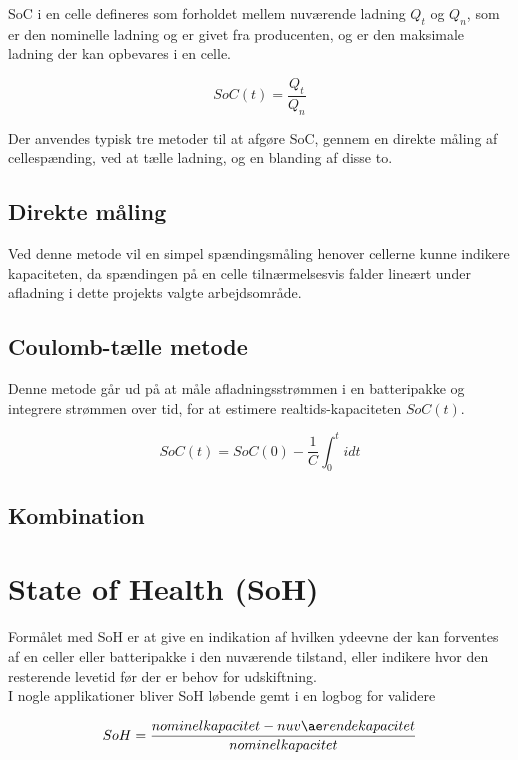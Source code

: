 SoC i en celle defineres som forholdet mellem nuværende ladning $Q_{t}$ og $Q_{n}$, som er den nominelle ladning og er givet fra producenten, og er den maksimale ladning der kan opbevares i en celle.

\begin {equation} 
SoC(t) = \frac{Q_t}{Q_n} \label{eq:soc}
\end {equation}

Der anvendes typisk tre metoder til at afgøre SoC, gennem en direkte måling af cellespænding, ved at tælle ladning, og en blanding af disse to.

\subsection{Direkte måling}
Ved denne metode vil en simpel spændingsmåling henover cellerne kunne indikere kapaciteten, da spændingen på en celle tilnærmelsesvis falder lineært under afladning i dette projekts valgte arbejdsområde.

\subsection{Coulomb-tælle metode}
Denne metode går ud på at måle afladningsstrømmen i en batteripakke og integrere strømmen over tid, for at estimere realtids-kapaciteten $SoC(t)$. 


\begin {equation} 
SoC(t) = SoC(0) - \frac{1}{C} \int_{0}^{t} idt  \label{eq:coulomb-count}
\end {equation}


\subsection{Kombination}


\section{State of Health (SoH)}
Formålet med SoH er at give en indikation af hvilken ydeevne der kan forventes af en celler eller batteripakke i den nuværende tilstand, eller indikere hvor den resterende levetid før der er behov for udskiftning.
\\
I nogle applikationer bliver SoH løbende gemt i en logbog for validere

\begin {equation} 
SoH = \frac{nominel \space kapacitet - nuværende  kapacitet}{nominel kapacitet} \label{eq:soh}
\end {equation}


